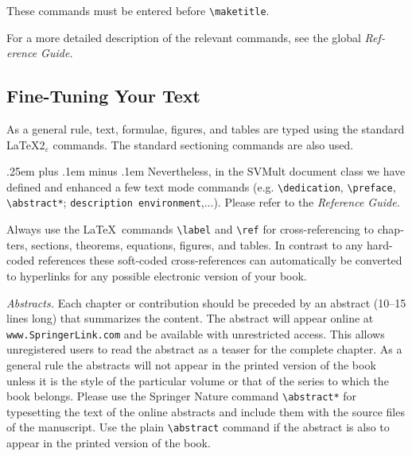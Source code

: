 \documentclass[graybox]{svmult}
\begin{document}
\begin{refguide}
\begin{sloppy}
\vspace*{-6pt}

\cprotect{}

These commands must be entered before \verb|\maketitle|.

For a more detailed description of the relevant commands, see the global {\it Ref­erence Guide.}

\enlargethispage{16pt}\vspace*{-6pt}

\subsection{Fine-Tuning Your Text}

 As a general rule, text, formulae, figures, and tables are typed using the standard \LaTeX2$_\varepsilon$ commands. The standard sectioning commands are also used.

{\spaceskip .25em plus .1em minus .1em Nevertheless, in the {\sc SVMult} document class we have defined and en­hanced a few text mode commands (e.g. \verb|\dedication|, \verb|\preface|, \verb|\abstract*|; \verb|description environment|,...). Please refer to the {\it Reference Guide.}}

Always use the \LaTeX~commands \verb|\label| and \verb|\ref| for cross-referencing to chap­ters, sections, theorems, equations, figures, and tables. In contrast to any hard-coded references these soft-coded cross-references can automatically be con­verted to hyperlinks for any possible electronic version of your book.

{\it Abstracts.} Each chapter or contribution should be preceded by an abstract (10--15 lines long) that summarizes the content. The abstract will appear online at {\tt www.SpringerLink.com} and be available with unrestricted access. This allows unregistered users to read the abstract as a teaser for the complete chapter. As a general rule the abstracts will not appear in the printed version of the book unless it is the style of the particular volume or that of the series to which the book belongs. Please use the Springer Nature command \verb|\abstract*| for typesetting the text of the online abstracts and include them with the source files of the manuscript. Use the plain \verb|\abstract| command if the abstract is also to appear in the printed version of the book.


\end{sloppy}
\end{refguide}
\end{document}

